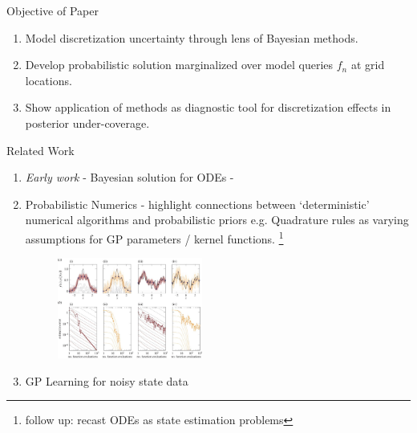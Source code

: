 \documentclass[usenames,dvipsnames]{beamer}
\theoremstyle{definition}
\let\oldcite=\cite
\renewcommand{\cite}[2][]{\textcolor{green}{\oldcite[#1]{#2}}}
\begin{document}
\begin{frame}{Objective of Paper}
    \begin{enumerate}
        \item Model discretization uncertainty through lens of Bayesian methods.
        
        \item Develop probabilistic solution marginalized over model queries $f_n$ at grid locations.
        
        \item Show application of methods as diagnostic tool for discretization effects in posterior under-coverage.
    \end{enumerate}
\end{frame}

\begin{frame}{Related Work}
\begin{enumerate}
    \item \emph{Early work} - Bayesian solution for ODEs - \cite{Skilling1992}

    \item Probabilistic Numerics \cite{hennig_probabilistic_2015} - highlight connections between `deterministic' numerical algorithms and probabilistic priors e.g. Quadrature rules as varying assumptions for GP parameters / kernel functions. \footnote[1]{follow up: recast ODEs as state estimation problems}
    
    \begin{figure}
        \centering
        \includegraphics[width=0.45\textwidth]{rspa20150142f01.jpg}
        \label{f: quad_bayes}
    \end{figure}
        

    \item GP Learning for noisy state data \cite{ye_gaussian_2023}
\end{enumerate}

\end{frame}
\end{document}
